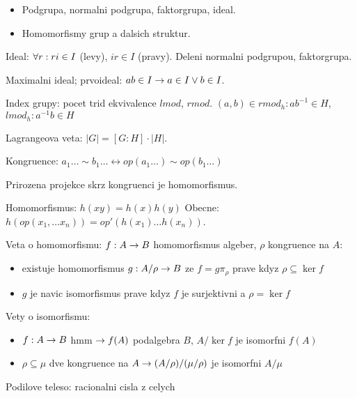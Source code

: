 \begin{itemize}
\item Podgrupa, normalni podgrupa, faktorgrupa, ideal.
\item Homomorfismy grup a dalsich struktur.
\end{itemize}

Ideal: $\forall r: ri\in I$ (levy), $ir\in I$ (pravy). Deleni normalni podgrupou,
faktorgrupa.

Maximalni ideal; prvoideal: $ab\in I\rightarrow a\in I\vee b\in I$.

Index grupy: pocet trid ekvivalence $lmod$, $rmod$.
$(a,b)\in rmod_h: ab^{-1}\in H$, $lmod_h: a^{-1}b\in H$

Lagrangeova veta: $|G|=[G:H]\cdot |H|$.

Kongruence: $a_1\ldots\sim b_1\ldots \leftrightarrow op(a_1\ldots)\sim
op(b_1\ldots)$

Prirozena projekce skrz kongruenci je homomorfismus.

Homomorfismus: $h(xy)=h(x)h(y)$
Obecne: $h(op(x_1,\ldots x_n))=op'(h(x_1)\ldots h(x_n))$.

Veta o homomorfismu: $f:A\rightarrow B$ homomorfismus algeber, $\rho$ kongruence na $A$:
\begin{itemize}
\item existuje homomorfismus $g:A/\rho\rightarrow B$ ze $f=g\pi_\rho$ prave kdyz
$\rho\subseteq\ker f$
\item $g$ je navic isomorfismus prave kdyz $f$ je surjektivni a $\rho=\ker f$
\end{itemize}

Vety o isomorfismu:
\begin{itemize}
\item $f:A\rightarrow B$ hmm $\rightarrow f(A)$ podalgebra $B$, $A/\ker f$ je isomorfni $f(A)$
\item $\rho\subseteq\mu$ dve kongruence na $A\rightarrow (A/\rho)/(\mu/\rho)$ je
isomorfni $A/\mu$
\end{itemize}

\begin{understood}
Podilove teleso: racionalni cisla z celych
\end{understood}
